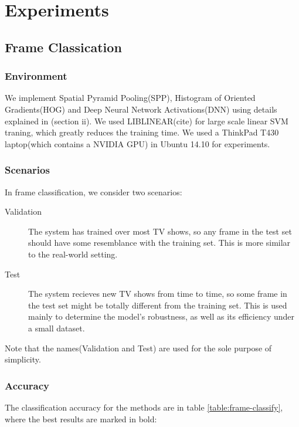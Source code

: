 \section{Experiments}
\subsection{Frame Classication}
\subsubsection{Environment}
We implement Spatial Pyramid Pooling(SPP), Histogram of Oriented Gradients(HOG) and Deep Neural Network Activations(DNN) using details explained in (section ii). We used LIBLINEAR(cite) for large scale linear SVM traning, which greatly reduces the training time. We used a ThinkPad T430 laptop(which contains a NVIDIA GPU) in Ubuntu 14.10 for experiments.\par
\subsubsection{Scenarios}
In frame classification, we consider two scenarios:
\begin{description}
    \item[Validation] The system has trained over most TV shows, so any frame in the test set should have some resemblance with the training set. This is more similar to the real-world setting.
    \item[Test] The system recieves new TV shows from time to time, so some frame in the test set might be totally different from the training set. This is used mainly to determine the model's robustness, as well as its efficiency under a small dataset.
\end{description}
Note that the names(Validation and Test) are used for the sole purpose of simplicity.
\subsubsection{Accuracy}
The classification accuracy for the methods are in table \ref{table:frame-classify}, where the best results are marked in bold:

